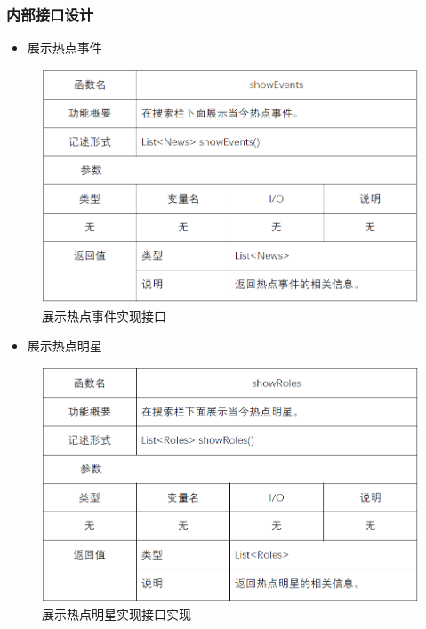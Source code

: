 \subsubsection{内部接口设计}
\begin{itemize}
	\item 展示热点事件
\end{itemize}
\begin{figure}[!htbp]
	\centering
	\includegraphics[scale=0.7]{image/b8.png} %
	\caption{展示热点事件实现接口} %
\end{figure}
\begin{itemize}
	\item 展示热点明星
\end{itemize}
\begin{figure}[!htbp]
	\centering
	\includegraphics[scale=0.7]{image/b9.png} %
	\caption{展示热点明星实现接口实现} %
\end{figure}
